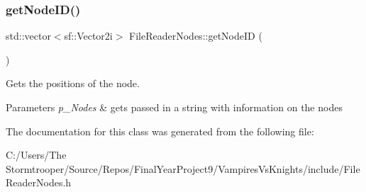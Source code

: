 \subsubsection{\texorpdfstring{get\+Node\+I\+D()}{getNodeID()}}
{\footnotesize\ttfamily std\+::vector$<$sf\+::\+Vector2i$>$ File\+Reader\+Nodes\+::get\+Node\+ID (\begin{DoxyParamCaption}{ }\end{DoxyParamCaption})}



Gets the positions of the node. 


\begin{DoxyParams}{Parameters}
{\em p\+\_\+\+Nodes} & gets passed in a string with information on the nodes \\
\hline
\end{DoxyParams}


The documentation for this class was generated from the following file\+:\begin{DoxyCompactItemize}
\item 
C\+:/\+Users/\+The Stormtrooper/\+Source/\+Repos/\+Final\+Year\+Project9/\+Vampires\+Vs\+Knights/include/File\+Reader\+Nodes.\+h\end{DoxyCompactItemize}
